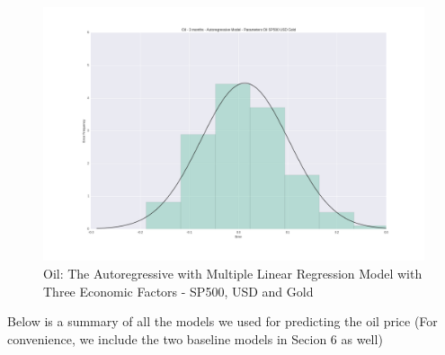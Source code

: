 \documentclass[runningheads]{llncs}
\begin{document}
\begin{figure}
\centering
\includegraphics[width=\textwidth]{Oil_SP500_USD_Gold.png}
\caption{Oil: The Autoregressive with Multiple Linear Regression Model with Three Economic Factors - SP500, USD and Gold}
\label{fig:Oil_SP500_USD_Gold.png}
\end{figure}

\noindent Below is a summary of all the models we used for predicting the oil price (For convenience, we include the two baseline models in Secion 6 as well) \\
\end{document}
